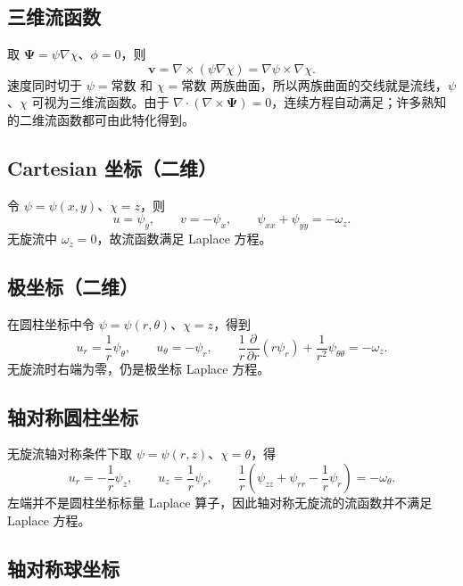 \documentclass[11pt,a4paper,openany,fontset=none]{ctexbook}
\begin{document}
\subsection{三维流函数}

取 $\bm\Psi=\psi\nabla\chi$、$\phi=0$，则
\begin{equation}
 \bm v=\nabla\times(\psi\nabla\chi)=\nabla\psi\times\nabla\chi. \tag{4.24.1}
\end{equation}
速度同时切于 $\psi=\text{常数}$ 和 $\chi=\text{常数}$ 两族曲面，所以两族曲面的交线就是流线，$\psi$、$\chi$ 可视为三维流函数。由于 $\nabla\cdot(\nabla\times\bm\Psi)=0$，连续方程自动满足；许多熟知的二维流函数都可由此特化得到。

\subsection{Cartesian 坐标（二维）}

令 $\psi=\psi(x,y)$、$\chi=z$，则
\begin{equation}
 u=\psi_y,\qquad v=-\psi_x,\qquad
 \psi_{xx}+\psi_{yy}=-\omega_z. \tag{4.24.2--4.24.3}
\end{equation}
无旋流中 $\omega_z=0$，故流函数满足 Laplace 方程。

\subsection{极坐标（二维）}

在圆柱坐标中令 $\psi=\psi(r,\theta)$、$\chi=z$，得到
\begin{equation}
 u_r=\frac1r\psi_\theta,\qquad u_\theta=-\psi_r,\qquad
 \frac1r\frac{\partial}{\partial r}(r\psi_r)+\frac1{r^2}\psi_{\theta\theta}=-\omega_z. \tag{4.24.5--4.24.6}
\end{equation}
无旋流时右端为零，仍是极坐标 Laplace 方程。

\subsection{轴对称圆柱坐标}

无旋流轴对称条件下取 $\psi=\psi(r,z)$、$\chi=\theta$，得
\begin{equation}
 u_r=-\frac1r\psi_z,\qquad u_z=\frac1r\psi_r,\qquad
 \frac1r\left(\psi_{zz}+\psi_{rr}-\frac1r\psi_r\right)=-\omega_\theta. \tag{4.24.8--4.24.10}
\end{equation}
左端并不是圆柱坐标标量 Laplace 算子，因此轴对称无旋流的流函数并不满足 Laplace 方程。

\subsection{轴对称球坐标}
\end{document}
